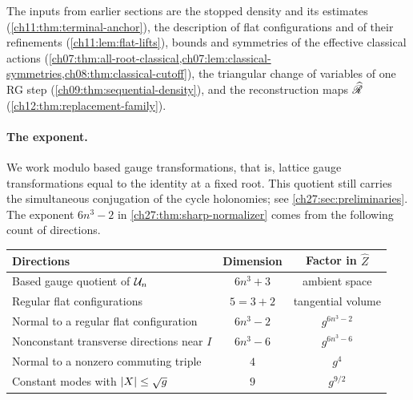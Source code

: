 The inputs from earlier sections are the stopped density and its estimates (\cref{ch11:thm:terminal-anchor}), the description of flat configurations and of their refinements (\cref{ch11:lem:flat-lifts}), bounds and symmetries of the effective classical actions (\cref{ch07:thm:all-root-classical,ch07:lem:classical-symmetries,ch08:thm:classical-cutoff}), the triangular change of variables of one RG step (\cref{ch09:thm:sequential-density}), and the reconstruction maps $\widehat{\mathscr R}$ (\cref{ch12:thm:replacement-family}).

\paragraph{The exponent.}
We work modulo based gauge transformations, that is, lattice gauge transformations equal to the identity at a fixed root. This quotient still carries the simultaneous conjugation of the cycle holonomies; see \cref{ch27:sec:preliminaries}. The exponent $6n^3-2$ in \cref{ch27:thm:sharp-normalizer} comes from the following count of directions.
\begin{center}
\small
\begin{tabular}{@{}lcc@{}}
\toprule
Directions & Dimension & Factor in $\widehat Z$\\
\midrule
Based gauge quotient of $\mathcal U_{n}$ & $6n^3+3$ & ambient space\\
Regular flat configurations & $5=3+2$ & tangential volume\\
Normal to a regular flat configuration & $6n^3-2$ & $g^{6n^3-2}$\\
Nonconstant transverse directions near $I$ & $6n^3-6$ & $g^{6n^3-6}$\\
Normal to a nonzero commuting triple & $4$ & $g^4$\\
Constant modes with $\lvert X\rvert\le\sqrt g$ & $9$ & $g^{9/2}$\\
\bottomrule
\end{tabular}
\end{center}
